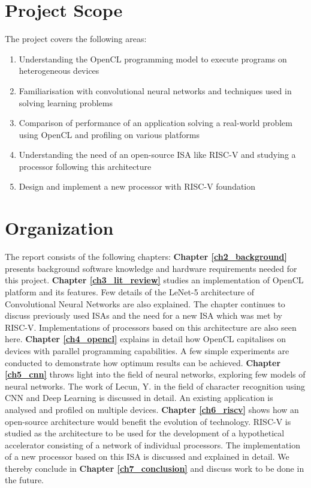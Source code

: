 \section{Project Scope}
\label{sect1_2}

The project covers the following areas:
\begin{enumerate}
\item Understanding the OpenCL programming model to execute programs on heterogeneous devices
\item Familiarisation with convolutional neural networks and  techniques used in solving learning problems
\item Comparison of performance of an application solving a real-world problem using OpenCL and profiling on various platforms
\item Understanding the need of an open-source ISA like RISC-V and studying a processor following this architecture
\item Design and implement a new processor with RISC-V foundation
\end{enumerate}

\section{Organization}
\label{sect1_3}
The report consists of the following chapters: 
\textbf{Chapter \ref{ch2_background}} presents background software knowledge and hardware requirements needed for this project.
\textbf{Chapter \ref{ch3_lit_review}} studies an implementation of OpenCL platform and its features. Few details of the LeNet-5 architecture of Convolutional Neural Networks are also explained. The chapter continues to discuss previously used ISAs and the need for a new ISA which was met by RISC-V. Implementations of processors based on this architecture are also seen here.
\textbf{Chapter \ref{ch4_opencl}} explains in detail how OpenCL capitalises on devices with parallel programming capabilities. A few simple experiments are conducted to demonstrate how optimum results can be achieved. 
\textbf{Chapter \ref{ch5_cnn}} throws light into the field of neural networks, exploring few models of neural networks. The work of Lecun, Y. in the field of character recognition using \ac{CNN} and Deep Learning is discussed in detail. An existing application is analysed and profiled on multiple devices.
\textbf{Chapter \ref{ch6_riscv}} shows how an open-source architecture would benefit the evolution of technology. RISC-V is studied as the architecture to be used for the development of a hypothetical accelerator consisting of a network of individual processors. The implementation of a new processor based on this ISA is discussed and explained in detail. 
We thereby conclude in \textbf{Chapter \ref{ch7_conclusion}} and discuss work to be done in the future.